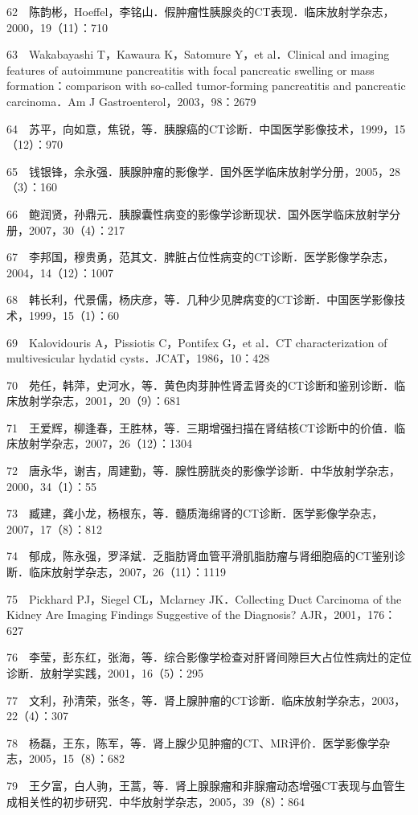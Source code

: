 62　陈韵彬，Hoeffel，李铭山．假肿瘤性胰腺炎的CT表现．临床放射学杂志，2000，19（11）：710

63　Wakabayashi T，Kawaura K，Satomure Y，et al．Clinical and imaging
features of autoimmune pancreatitis with focal pancreatic swelling or
mass formation：comparison with so-called tumor-forming pancreatitis and
pancreatic carcinoma．Am J Gastroenterol，2003，98：2679

64　苏平，向如意，焦锐，等．胰腺癌的CT诊断．中国医学影像技术，1999，15（12）：970

65　钱银锋，余永强．胰腺肿瘤的影像学．国外医学临床放射学分册，2005，28（3）：160

66　鲍润贤，孙鼎元．胰腺囊性病变的影像学诊断现状．国外医学临床放射学分册，2007，30（4）：217

67　李邦国，穆贵勇，范其文．脾脏占位性病变的CT诊断．医学影像学杂志，2004，14（12）：1007

68　韩长利，代景儒，杨庆彦，等．几种少见脾病变的CT诊断．中国医学影像技术，1999，15（1）：60

69　Kalovidouris A，Pissiotis C，Pontifex G，et al．CT characterization
of multivesicular hydatid cysts．JCAT，1986，10：428

70　苑任，韩萍，史河水，等．黄色肉芽肿性肾盂肾炎的CT诊断和鉴别诊断．临床放射学杂志，2001，20（9）：681

71　王爱辉，柳逢春，王胜林，等．三期增强扫描在肾结核CT诊断中的价值．临床放射学杂志，2007，26（12）：1304

72　唐永华，谢吉，周建勤，等．腺性膀胱炎的影像学诊断．中华放射学杂志，2000，34（1）：55

73　臧建，龚小龙，杨根东，等．髓质海绵肾的CT诊断．医学影像学杂志，2007，17（8）：812

74　郁成，陈永强，罗泽斌．乏脂肪肾血管平滑肌脂肪瘤与肾细胞癌的CT鉴别诊断．临床放射学杂志，2007，26（11）：1119

75　Pickhard PJ，Siegel CL，Mclarney JK．Collecting Duct Carcinoma of
the Kidney Are Imaging Findings Suggestive of the Diagnosis?
AJR，2001，176：627

76　李莹，彭东红，张海，等．综合影像学检查对肝肾间隙巨大占位性病灶的定位诊断．放射学实践，2001，16（5）：295

77　文利，孙清荣，张冬，等．肾上腺肿瘤的CT诊断．临床放射学杂志，2003，22（4）：307

78　杨磊，王东，陈军，等．肾上腺少见肿瘤的CT、MR评价．医学影像学杂志，2005，15（8）：682

79　王夕富，白人驹，王蒿，等．肾上腺腺瘤和非腺瘤动态增强CT表现与血管生成相关性的初步研究．中华放射学杂志，2005，39（8）：864

